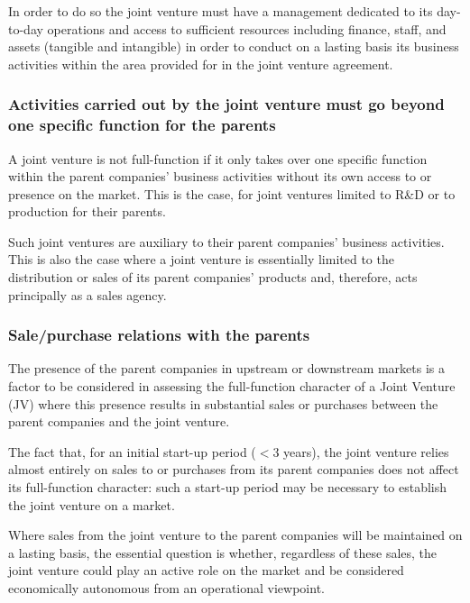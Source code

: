             In order to do so the joint venture must have a management dedicated to its day-to-day operations and access to sufficient resources including finance, staff, and assets (tangible and intangible) in order to conduct on a lasting basis its business activities within the area provided for in the joint venture agreement.

        \subsubsection{Activities carried out by the joint venture must go beyond one specific function for the parents}

            A joint venture is not full-function if it only takes over one specific function within the parent companies' business activities without its own access to or presence on the market. This is the case, for joint ventures limited to R\&D or to production for their parents. 
            
            Such joint ventures are auxiliary to their parent companies' business activities. This is also the case where a joint venture is essentially limited to the distribution or sales of its parent companies' products and, therefore, acts principally as a sales agency.

        \subsubsection{Sale/purchase relations with the parents}

            The presence of the parent companies in upstream or downstream markets is a factor to be considered in assessing the full-function character of a Joint Venture (JV) where this presence results in substantial sales or purchases between the parent companies and the joint venture.

            The fact that, for an initial start-up period (\(< 3\) years), the joint venture relies almost entirely on sales to or purchases from its parent companies does not affect its full-function character: such a start-up period may be necessary to establish the joint venture on a market.
            
            Where sales from the joint venture to the parent companies will be maintained on a lasting basis, the essential question is whether, regardless of these sales, the joint venture could play an active role on the market and be considered economically autonomous from an operational viewpoint. 
            
